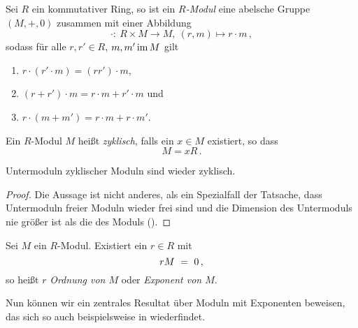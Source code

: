 \begin{definition}[Modul]
  Sei $R$ ein kommutativer Ring, so ist ein \emph{$R$-Modul}
  eine abelsche Gruppe $(M,+,0)$ zusammen mit einer 
  Abbildung 
  \[ \cdot:\ R \times M \to M,\ (r,m) \mapsto r\cdot m\,,\]
  sodass für alle $r, r' \in R$, $m,m' \operatorname{im} M$ gilt
  \begin{enumerate}
    \item $r\cdot (r'\cdot m) = (rr')\cdot m$,
    \item $(r+r')\cdot m = r\cdot m + r'\cdot m$ und 
    \item $r\cdot(m+m') = r\cdot m + r\cdot m'$.
  \end{enumerate}
\end{definition}


\begin{definition}
  Ein $R$-Modul $M$ heißt \emph{zyklisch}, falls
  ein $x\in M$ existiert, so dass
  \[ M = xR\,.\]
\end{definition}


\begin{satz}
  \label{satz:untermoduln_bleiben_zyklisch}
  Untermoduln zyklischer Moduln sind wieder zyklisch.
\end{satz}
\begin{proof}
  Die Aussage ist nicht anderes, als ein Spezialfall der Tatsache, dass
  Untermoduln freier Moduln wieder frei sind und die Dimension des Untermoduls
  nie größer ist als die des Moduls 
  (\autocite[Theorem 7.1]{lang2002algebra}).
\end{proof}

\begin{definition}
  Sei $M$ ein $R$-Modul. Existiert ein $r \in R$ mit
  \[ rM \ =\  0\,,\]
  so heißt $r$ \emph{Ordnung von $M$} oder \emph{Exponent von $M$}.
\end{definition}


Nun können wir ein zentrales Resultat über Moduln mit Exponenten beweisen, das
sich so auch beispielsweise in \autocite[Lemma 8.10]{hartley1974rings}
wiederfindet.

